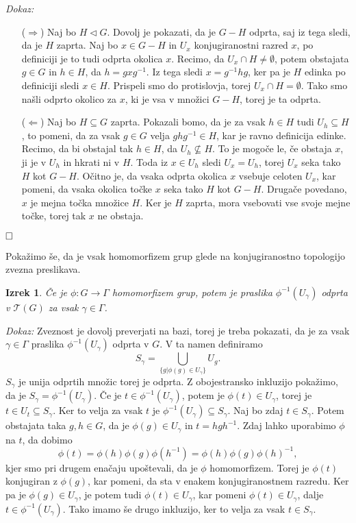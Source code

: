 \documentclass[a4paper,12pt]{article}
\def\qed{$\hfill\Box$}   %
\newtheorem{izrek}{Izrek}
\begin{document}
\noindent
{\em Dokaz:\/}
    \begin{itemize}
        \item[($\Rightarrow$)] Naj bo $H \triangleleft G$. Dovolj je pokazati, da je $G - H$ odprta, saj iz tega sledi, da je $H$ zaprta.
        Naj bo $x \in G - H$ in $U_x$ konjugiranostni razred $x$, po definiciji je to tudi odprta okolica $x$.
        Recimo, da $U_x \cap H \neq \emptyset$, potem obstajata $g \in G$ in $h \in H$, da $h = gxg^{-1}$.
        Iz tega sledi $x = g^{-1}hg$, ker pa je $H$ edinka po definiciji sledi $x \in H$. Prispeli smo do protislovja, torej $U_x \cap H = \emptyset$.
        Tako smo našli odprto okolico za $x$, ki je vsa v množici $G - H$, torej je ta odprta.
        \item[($\Leftarrow$)] Naj bo $H \subseteq G$ zaprta. Pokazali bomo, da je za vsak $h \in H$ tudi
        $U_h \subseteq H$, to pomeni, da za vsak $g \in G$ velja $ghg^{-1} \in H$, kar je ravno definicija edinke. Recimo, da bi obstajal tak $h \in H$,
        da $U_h \nsubseteq H$. To je mogoče le, če obstaja $x$, ji je v $U_h$ in hkrati ni v $H$. Toda iz $x \in U_h$ sledi $U_x = U_h$, torej $U_x$ seka tako $H$ kot $G - H$.
        Očitno je, da vsaka odprta okolica $x$ vsebuje celoten $U_x$, kar pomeni, da vsaka okolica točke $x$ seka tako $H$ kot $G - H$. Drugače povedano, $x$ je mejna točka množice $H$.
        Ker je $H$ zaprta, mora vsebovati vse svoje mejne točke, torej tak $x$ ne obstaja.
    \end{itemize} 
\qed

Pokažimo še, da je vsak homomorfizem grup glede na konjugiranostno topologijo zvezna preslikava.

\begin{izrek}
    Če je $\phi: G \rightarrow \Gamma$ homomorfizem grup, potem je praslika $\phi^{-1}(U_\gamma)$ odprta v $\mathcal{T}(G)$ za vsak $\gamma \in \Gamma$.
\end{izrek}

\noindent
{\em Dokaz:\/}
    Zveznost je dovolj preverjati na bazi, torej je treba pokazati, da je za vsak $\gamma \in \Gamma$ praslika $\phi^{-1}(U_\gamma)$ odprta v $G$.
    V ta namen definiramo
    \[ S_\gamma = \bigcup_{\{g | \phi(g) \in U_\gamma\}} U_g .\]
    $S_\gamma$ je unija odprtih množic torej je odprta. Z obojestransko inkluzijo pokažimo, da je $S_\gamma = \phi^{-1}(U_\gamma)$.
    Če je $t \in \phi^{-1}(U_\gamma)$, potem je $\phi(t) \in U_\gamma$, torej je $t \in U_t \subseteq S_\gamma$. Ker to velja za vsak $t$ je $\phi^{-1}(U_\gamma) \subseteq S_\gamma$.
    Naj bo zdaj $t \in S_\gamma$. Potem obstajata taka $g,h \in G$, da je $\phi(g) \in U_\gamma$ in $t = hgh^{-1}$. Zdaj lahko uporabimo $\phi$ na $t$, da dobimo
    \[\phi(t) = \phi(h)\phi(g)\phi(h^{-1}) = \phi(h)\phi(g)\phi(h)^{-1} ,\] kjer smo pri drugem enačaju upoštevali, da je $\phi$ homomorfizem.
    Torej je $\phi(t)$ konjugiran z $\phi(g)$, kar pomeni, da sta v enakem konjugiranostnem razredu. Ker pa je $\phi(g) \in U_\gamma$, je potem tudi $\phi(t) \in U_\gamma$,
    kar pomeni $\phi(t) \in U_\gamma$, dalje $t \in \phi^{-1}(U_\gamma)$. Tako imamo še drugo inkluzijo, ker to velja za vsak $t \in S_\gamma$.
\end{document}

